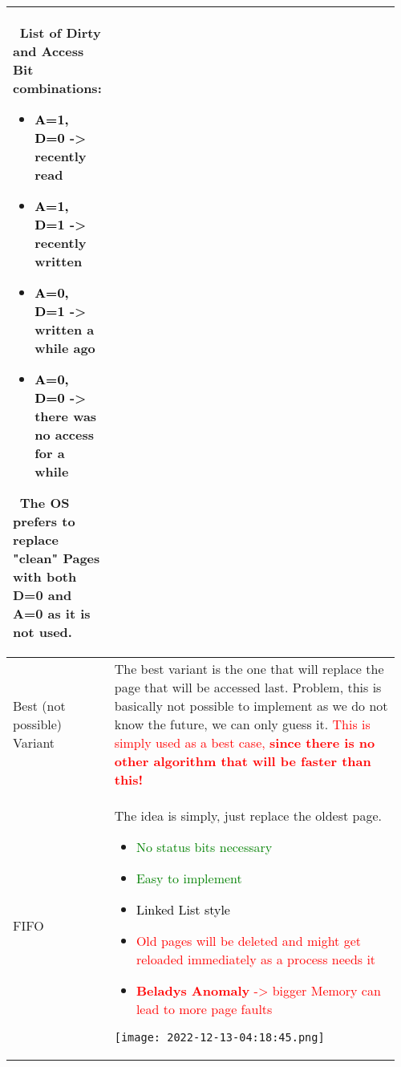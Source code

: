 \documentclass[main.tex,fontsize=8pt,paper=a4,paper=portrait,DIV=calc,]{scrartcl}
\begin{document}
\begin{table}[ht!]
\begin{tabular}{|m{0.2\linewidth}|m{0.755\linewidth}|}
\begin{itemize}
\vspace{-3mm}
\end{itemize}
\, \newline
List of Dirty and Access Bit combinations:\newline
\begin{itemize}
\item \textcolor{black}{A=1, D=0} -> recently read
\item \textcolor{black}{A=1, D=1} -> recently written
\item \textcolor{black}{A=0, D=1} -> written a while ago
\item \textcolor{black}{A=0, D=0} -> there was no access for a while
\vspace{-3mm}
\end{itemize}
\, \newline
\textcolor{OliveGreen}{The OS prefers to replace "clean" Pages with both D=0 and A=0 as it is not used.}\\
\hline
Best (not possible) Variant & 
The best variant is the one that will replace the page that will be accessed last. Problem, this is basically not possible to implement as we do not know the future, we can only guess it.\newline 
\textcolor{red}{This is simply used as a best case, \textbf{since there is no other algorithm that will be faster than this!}}\\
\hline
FIFO & 
The idea is simply, just replace the oldest page.\newline
\begin{itemize}
\item \textcolor{green}{No status bits necessary}
\item \textcolor{green}{Easy to implement}
\item \textcolor{black}{Linked List style}
\item \textcolor{red}{Old pages will be deleted and might get reloaded immediately as a process needs it}
\item \textcolor{red}{\textbf{Beladys Anomaly} -> bigger Memory can lead to more page faults}
\end{itemize} 
\texttt{[image: 2022-12-13-04:18:45.png]}
\\
\hline
\end{tabular}
\end{table}
\pagebreak
\end{document}
